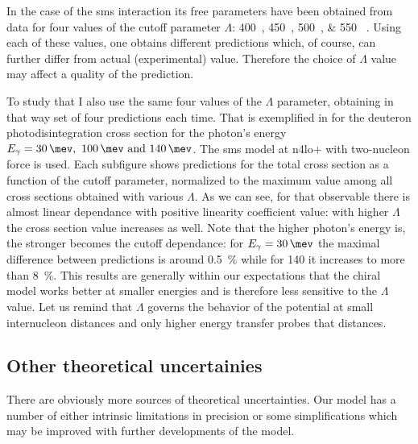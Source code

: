     In the case of the \gls{sms} interaction its free parameters have been obtained from data for 
   four values of the cutoff parameter $\Lambda$:
   \SIlist[list-units = single]{400;450;500;550}{\mev} \cite{reinkrebs2018}.
   Using each of these values, one obtains different predictions which, of course, can further differ 
   from actual (experimental) value. Therefore the choice of $\Lambda$ value
   may affect a quality of the prediction.

    To study that I also use the same four values of the $\Lambda$ parameter,
    obtaining in that way set of four predictions each time.
    That is exemplified in   for the deuteron photodisintegration cross section for the
    photon's energy $E_\gamma = \SIlist{30;100;140}{\mev}$.
    The \gls{sms} model at \gls{n4lo+} with two-nucleon force is used.
    Each subfigure shows predictions for the total cross section as 
    a function of the cutoff parameter,
    normalized to the maximum value among all cross sections
    obtained with various $\Lambda$.
    As we can see, for that observable
    there is almost linear dependance with positive linearity coefficient value:
    with higher $\Lambda$ the cross section value increases as well.
    Note that the higher photon's energy is,
    the stronger becomes the cutoff dependance: for $E_\gamma=\SI{30}{\mev}$
    the maximal difference between predictions is around \SI{0.5}{\percent} while
    for \SI{140}{\mev} it increases to more than \SI{8}{\percent}.
    This results are
    generally within our expectations that the chiral model works better at
    smaller energies
    and is therefore less sensitive to the $\Lambda$ value. Let us remind that $\Lambda$ 
    governs the behavior of the potential at small internucleon distances and only higher energy transfer probes that distances. 



    \subsection*{Other theoretical uncertainies}

    There are obviously more sources of theoretical uncertainties. 
    Our model has a number of either intrinsic limitations in precision or 
    some simplifications which may be improved with further developments of the model.
    
